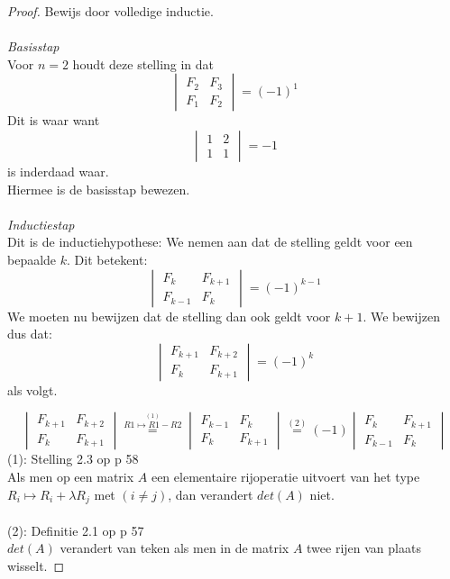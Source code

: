 \documentclass[lineaire_algebra_oplossingen.tex]{subfiles}
\begin{document}
\begin{proof}
Bewijs door volledige inductie.\\\\
\emph{Basisstap}\\
Voor $n=2$ houdt deze stelling in dat
\[
\begin{vmatrix}
F_{2}   & F_{3}\\
F_{1} & F_{2}
\end{vmatrix}
=
(-1)^{1}
\]
Dit is waar want
\[
\begin{vmatrix}
1 & 2\\
1 & 1
\end{vmatrix}
=
-1
\]
is inderdaad waar.\\
Hiermee is de basisstap bewezen.\\\\
\emph{Inductiestap}\\
Dit is de inductiehypothese: We nemen aan dat de stelling geldt voor een bepaalde $k$. Dit betekent:
\[
\begin{vmatrix}
F_{k}   & F_{k+1}\\
F_{k-1} & F_{k}
\end{vmatrix}
=
(-1)^{k-1}
\]
We moeten nu bewijzen dat de stelling dan ook geldt voor $k+1$.
We bewijzen dus dat:
\[
\begin{vmatrix}
F_{k+1}   & F_{k+2}\\
F_{k} & F_{k+1}
\end{vmatrix}
=
(-1)^{k}
\]
als volgt.

\[
\begin{vmatrix}
F_{k+1}   & F_{k+2}\\
F_{k} & F_{k+1}
\end{vmatrix}
\overset{\overset{(1)}{R1 \longmapsto R1-R2}}{=}
\begin{vmatrix}
F_{k-1}   & F_{k}\\
F_{k} & F_{k+1}
\end{vmatrix}
\overset{(2)}{=}
(-1)
\begin{vmatrix}
F_{k} & F_{k+1}\\
F_{k-1}   & F_{k}
\end{vmatrix}
\]
(1): Stelling 2.3 op p 58\\
Als men op een matrix $A$ een elementaire rijoperatie uitvoert van het type $R_{i} \longmapsto R_{i}+\lambda R_{j}$ met $(i \neq j)$, dan verandert $det(A)$ niet.\\\\
(2): Definitie 2.1 op p 57\\
$det(A)$ verandert van teken als men in de matrix $A$ twee rijen van plaats wisselt.


\end{proof}
\end{document}
